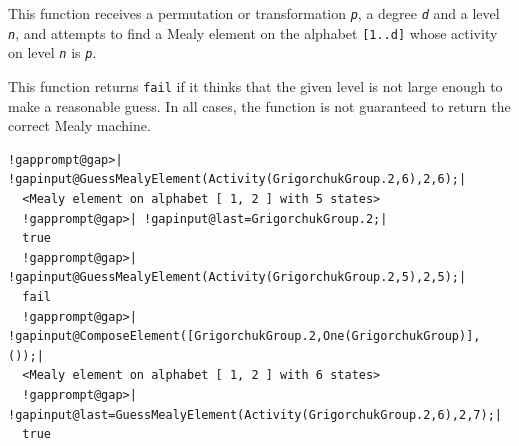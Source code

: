 \documentclass[a4paper,11pt]{report}
\begin{document}
{{{ This function receives a permutation or transformation \mbox{\texttt{\mdseries\slshape p}}, a degree \mbox{\texttt{\mdseries\slshape d}} and a level \mbox{\texttt{\mdseries\slshape n}}, and attempts to find a Mealy element on the alphabet \texttt{[1..d]} whose activity on level \mbox{\texttt{\mdseries\slshape n}} is \mbox{\texttt{\mdseries\slshape p}}. 

 This function returns \texttt{fail} if it thinks that the given level is not large enough to make a reasonable
guess. In all cases, the function is not guaranteed to return the correct
Mealy machine. 
\begin{Verbatim}[commandchars=!@|,fontsize=\small,frame=single,label=Example]
  !gapprompt@gap>| !gapinput@GuessMealyElement(Activity(GrigorchukGroup.2,6),2,6);|
  <Mealy element on alphabet [ 1, 2 ] with 5 states>
  !gapprompt@gap>| !gapinput@last=GrigorchukGroup.2;|
  true
  !gapprompt@gap>| !gapinput@GuessMealyElement(Activity(GrigorchukGroup.2,5),2,5);|
  fail
  !gapprompt@gap>| !gapinput@ComposeElement([GrigorchukGroup.2,One(GrigorchukGroup)],());|
  <Mealy element on alphabet [ 1, 2 ] with 6 states>
  !gapprompt@gap>| !gapinput@last=GuessMealyElement(Activity(GrigorchukGroup.2,6),2,7);|
  true
\end{Verbatim}
 }

 }

 }

 
\end{document}

